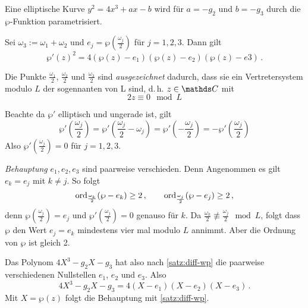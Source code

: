 \begin{beme}
Eine elliptische Kurve $y^2=4x^3+ax-b$ wird für $a=-g_2$ und $b=-g_3$ durch die $\wp$-Funktion parametrisiert.
\end{beme}

\begin{koro}
Sei $\omega_3 := \omega_1 + \omega_2$ und $e_j = \wp(\frac{\omega_j}{2})$ für $j=1,2,3$.
Dann gilt
\[
	\wp'(z)^2 = 4(\wp(z)-e_1)(\wp(z)-e_2)(\wp(z)-e3)
	\,.
\]
\end{koro}

\begin{beme}
Die Punkte $\frac{\omega_1}{2}$, $\frac{\omega_2}{2}$ und $\frac{\omega_3}{2}$ sind \emph{ausgezeichnet} dadurch, dass sie ein Vertretersystem modulo $L$ der sogennanten  von L sind, d.\,h. $z\in\CC$ mit
\[
	2z \equiv 0 \mod L
\]
\end{beme}

\begin{bewe}
Beachte da $\wp'$ elliptisch und ungerade ist, gilt
\[
	\wp'\left(\frac{\omega_j}{2}\right)
	= \wp'\left(\frac{\omega_j}{2}-\omega_j\right)
	= \wp'\left(-\frac{\omega_j}{2}\right)
	= - \wp'\left(\frac{\omega_j}{2}\right)
\]
Also $\wp'(\frac{\omega_j}{2}) = 0$ für $j=1,2,3$.

\emph{Behauptung}
$e_1, e_2, e_3$ sind paarweise verschieden.
Denn Angenommen es gilt $e_k = e_j$ mit $k \not= j$.
So folgt
\[
	{\textstyle \operatorname*{ord}_{\frac{\omega_k}{2}}} (\wp-e_k) \geq 2
	\,,\qquad
	{\textstyle \operatorname*{ord}_{\frac{\omega_j}{2}}} (\wp-e_j) \geq 2
	\,,
\]
denn $\wp(\frac{\omega_j}{2}) = e_j$ und $\wp'(\frac{\omega_j}{2}) = 0$ genauso für $k$.
Da $\frac{\omega_k}{2} \not\equiv \frac{\omega_j}{2} \mod L$, folgt dass $\wp$ den Wert $e_j = e_k$ mindestens vier mal modulo $L$ annimmt.
Aber die Ordnung von $\wp$ ist gleich 2. \blitz

Das Polynom $4X^3-g_2X-g_3$ hat also nach \autoref{satz:diff-wp} die paarweise verschiedenen Nullstellen $e_1$, $e_2$ und $e_3$.
Also
\[
	4X^3-g_2X-g_3 = 4(X-e_1)(X-e_2)(X-e_3)
	\,.
\]
Mit $X = \wp(z)$ folgt die Behauptung mit \autoref{satz:diff-wp}.
\end{bewe}